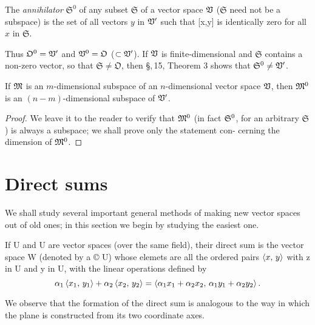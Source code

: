 \begin{definition}
    The \emph{annihilator} \(\mathfrak{S}^0\) of any subset \(\mathfrak{S}\) of
    a vector space \(\mathfrak{V}\) (\(\mathfrak{S}\) need not be a subspace) is the
    set of all vectors \(y\) in \(\mathfrak{V}'\) such that [x,y] is identically zero
    for all \(x\) in \(\mathfrak{S}\).
\end{definition}

Thus \(\mathfrak{O}^0 = \mathfrak{V}'\) and \(\mathfrak{V}^0 = \mathfrak{O}\) (\(\subset
\mathfrak{V}'\)). If \(\mathfrak{V}\) is finite-dimensional and \(\mathfrak{S}\) contains a
non-zero vector, so that \(\mathfrak{S} \neq \mathfrak{O}\), then \S,\,15,
Theorem 3 shows that \(\mathfrak{S}^0 \neq \mathfrak{V}'\).

\begin{theorem}
    If \(\mathfrak{M}\) is an \(m\)-dimensional subspace of an \(n\)-dimensional
    vector space \(\mathfrak{V}\), then \({\mathfrak{M}^0}\) is an \((n - m)\)-dimensional
    subspace of \(\mathfrak{V}'\).
\end{theorem}

\begin{proof}
    We leave it to the reader to verify that \({\mathfrak{M}^0}\) (in fact \({\mathfrak{S}^0}\),
    for an arbitrary \(\mathfrak{S}\)) is always a subspace; we shall prove only
    the statement con- cerning the dimension of \({\mathfrak{M}^0}\).
\end{proof}


\section{Direct sums}

We shall study several important general methods of making new vector spaces out
of old ones; in this section we begin by studying the easiest one.

\begin{definition}
    If U and U are vector spaces (over the same field), their direct sum is the vector space W (denoted by a © U) whose elemets are all the ordered pairs \(\left\langle x,\,y\right\rangle\) with z in U and y in U, with the linear operations defined by
    \begin{equation*}
        \alpha_1 \left\langle x_1,\,y_1\right\rangle + \alpha_2 \left\langle x_2,\,y_2\right\rangle = \left\langle\alpha_1 x_1 + \alpha_2 x_2,\,\alpha_1 y_1 + \alpha_2 y_2\right\rangle.
    \end{equation*}
\end{definition}

We observe that the formation of the direct sum is analogous to the way in which
the plane is constructed from its two coordinate axes.

